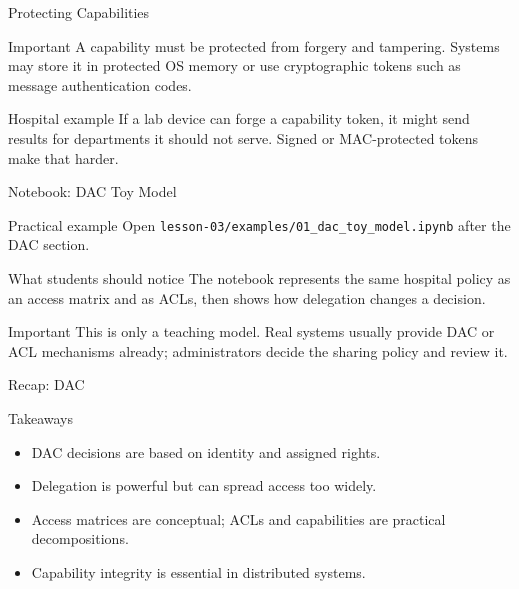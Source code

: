 \documentclass[presentation]{beamer}
\begin{document}
\begin{frame}[c]{Protecting Capabilities}
\begin{block}{Important}
A capability must be protected from forgery and tampering. Systems may store it in protected OS
memory or use cryptographic tokens such as message authentication codes.
\end{block}

\begin{exampleblock}{Hospital example}
If a lab device can forge a capability token, it might send results for departments it should not
serve. Signed or MAC-protected tokens make that harder.
\end{exampleblock}
\end{frame}

\begin{frame}[c]{Notebook: DAC Toy Model}
\begin{block}{Practical example}
Open \texttt{lesson-03/examples/01\_dac\_toy\_model.ipynb} after the DAC section.
\end{block}

\begin{exampleblock}{What students should notice}
The notebook represents the same hospital policy as an access matrix and as ACLs, then shows how
delegation changes a decision.
\end{exampleblock}

\begin{block}{Important}
This is only a teaching model. Real systems usually provide DAC or ACL mechanisms already;
administrators decide the sharing policy and review it.
\end{block}
\end{frame}

\begin{frame}[c]{Recap: DAC}
\begin{block}{Takeaways}
\begin{itemize}
    \item DAC decisions are based on identity and assigned rights.
    \item Delegation is powerful but can spread access too widely.
    \item Access matrices are conceptual; ACLs and capabilities are practical decompositions.
    \item Capability integrity is essential in distributed systems.
\end{itemize}
\end{block}
\end{frame}
\end{document}
